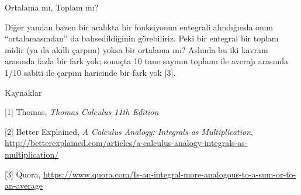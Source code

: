 \documentclass[12pt,fleqn]{article}\usepackage{../../common}
\begin{document}
Ortalama mı, Toplam mı?

Diğer yandan bazen bir aralıkta bir fonksiyonun entegrali alındığında onun
``ortalamasından'' da bahsedildiğinin görebiliriz. Peki bir entegral bir
toplam midir (ya da akıllı çarpım) yoksa bir ortalama mı? Aslında bu iki
kavram arasında fazla bir fark yok; sonuçta 10 tane sayının toplamı ile
averajı arasında 1/10 sabiti ile çarpım haricinde bir fark yok [3]. 

Kaynaklar

[1] Thomas, {\em Thomas Calculus 11th Edition}

[2] Better Explained, {\em A Calculus Analogy: Integrals as  Multiplication},
    \url{http://betterexplained.com/articles/a-calculus-analogy-integrals-as-multiplication/}

[3] Quora, \url{https://www.quora.com/Is-an-integral-more-analogous-to-a-sum-or-to-an-average}
\end{document}
